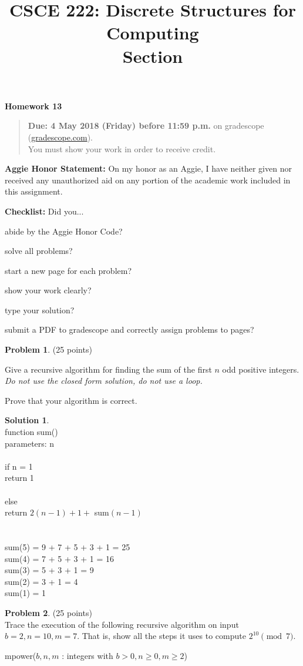 \documentclass{article}
\title{CSCE 222: Discrete Structures for Computing\\Section \mysectionnumber\\\mysemester}
\author{\myname}
\date{}
\theoremstyle{definition}
\newtheorem{problem}{Problem}
\newtheorem*{solution}{Solution}
\newcommand{\honor}{\noindent \textbf{Aggie Honor Statement: }On my honor as an Aggie, I have neither
  given nor received any unauthorized aid on any portion of the academic work included in this assignment.
}
\newcommand{\checklist}{\noindent\textbf{Checklist:}
Did you...
\begin{compactenum}
\item abide by the Aggie Honor Code?
\item solve all problems?
\item start a new page for each problem?
\item show your work clearly?
\item type your solution?
\item submit a PDF to gradescope and correctly assign problems to pages?
\end{compactenum}
}
\newcommand{\problemset}[1]{\begin{center}\textbf{Homework #1}\end{center}}
\newcommand{\duedate}[1]{\begin{quote}\textbf{Due: #1} on gradescope (\url{gradescope.com}). \\You must show your work in order to receive credit.\end{quote}}
\newcommand{\homeworknumber}[0]{13}
\begin{document}
\maketitle
\problemset{\homeworknumber}
\duedate{4 May 2018 (Friday) before 11:59 p.m.}
\bigskip

\honor
\bigskip

\checklist
\bigskip


\begin{problem} (25 points)
\begin{compactenum}
\renewcommand{\theenumi}{\alph{enumi}}
\item Give a recursive algorithm for finding the sum of the first $n$ odd positive integers.\\
\textit{Do not use the closed form solution, do not use a loop.}
\item Prove that your algorithm is correct.
\end{compactenum}
\end{problem}

\begin{solution}\ \\
 function sum()\ \\
 parameters: n\ \\
 \ \\
 \noindent
 if n = 1\ \\
 \indent return 1\ \\
 \ \\
 else \ \\
 \indent return $2(n-1) + 1 +$ sum$(n-1)$\ \\
 \ \\
 \ \\
 sum(5) = 9 + 7 + 5 + 3 + 1 = 25\ \\
 sum(4) = 7 + 5 + 3 + 1 = 16\ \\
 sum(3) = 5 + 3 + 1 = 9\ \\
 sum(2) = 3 + 1 = 4 \ \\
 sum(1) = 1\ \\
\end{solution}

\newpage

\begin{problem} (25 points)\\
Trace the execution of the following recursive algorithm on input $b=2,n=10,m=7$.  That is, show all the steps it uses to compute $2^{10} \pmod{7}$.
\begin{procedure}
\caption{mpower($b,n,m$ : integers with $b>0,n\geq 0,m\geq 2$)}
\DontPrintSemicolon
{}
\end{procedure}
\end{problem}
\end{document}
